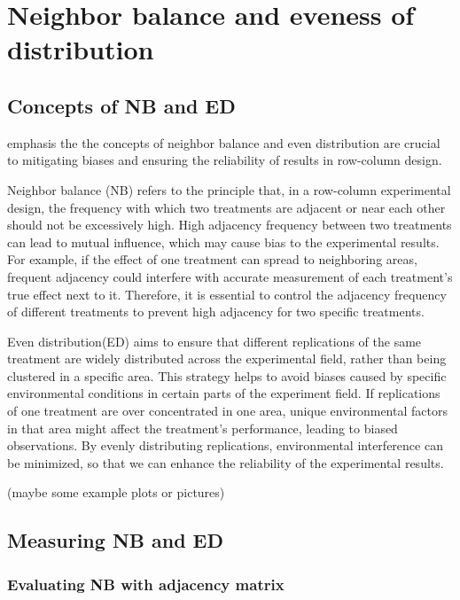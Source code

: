 \documentclass[
  a4paper,
  oneside,
  openany,
  12pt,
  onecolumn]{book}
\theoremstyle{definition}
\theoremstyle{plain}
\theoremstyle{remark}
\begin{document}
\section{Neighbor balance and eveness of
distribution}\label{neighbor-balance-and-eveness-of-distribution}

\subsection{Concepts of NB and ED}\label{concepts-of-nb-and-ed}

\citet{piepho2018neighbor} emphasis the the concepts of neighbor balance
and even distribution are crucial to mitigating biases and ensuring the
reliability of results in row-column design.

Neighbor balance (NB) refers to the principle that, in a row-column
experimental design, the frequency with which two treatments are
adjacent or near each other should not be excessively high. High
adjacency frequency between two treatments can lead to mutual influence,
which may cause bias to the experimental results. For example, if the
effect of one treatment can spread to neighboring areas, frequent
adjacency could interfere with accurate measurement of each treatment's
true effect next to it. Therefore, it is essential to control the
adjacency frequency of different treatments to prevent high adjacency
for two specific treatments.

Even distribution(ED) aims to ensure that different replications of the
same treatment are widely distributed across the experimental field,
rather than being clustered in a specific area. This strategy helps to
avoid biases caused by specific environmental conditions in certain
parts of the experiment field. If replications of one treatment are over
concentrated in one area, unique environmental factors in that area
might affect the treatment's performance, leading to biased
observations. By evenly distributing replications, environmental
interference can be minimized, so that we can enhance the reliability of
the experimental results.

(maybe some example plots or pictures)

\subsection{Measuring NB and ED}\label{measuring-nb-and-ed}

\subsubsection{Evaluating NB with adjacency
matrix}\label{evaluating-nb-with-adjacency-matrix}
\end{document}

